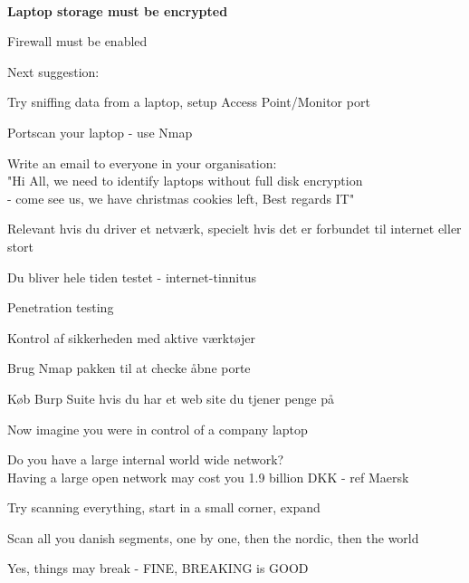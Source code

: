 \documentclass[Screen16to9,17pt]{foils}
\begin{document}
{~}
\begin{list1}
\item {\bf Laptop storage must be encrypted}
\item Firewall must be enabled
\item Next suggestion:
\begin{list2}
\item Try sniffing data from a laptop, setup Access Point/Monitor port
\item Portscan your laptop - use Nmap
\item Write an email to everyone in your organisation:\\
"Hi All, we need to identify laptops without full disk encryption \\
- come see us, we have christmas cookies left, Best regards IT"
\end{list2}
\end{list1}




\begin{list2}
\item Relevant hvis du driver et netværk, specielt hvis det er forbundet til internet eller stort
\item Du bliver hele tiden testet - internet-tinnitus
\item Penetration testing
\item Kontrol af sikkerheden med aktive værktøjer
\item Brug Nmap pakken til at checke åbne porte
\item Køb Burp Suite hvis du har et web site du tjener penge på
\end{list2}




\begin{list2}
\item Now imagine you were in control of a company laptop
\item Do you have a large internal world wide network?\\
Having a large open network may cost you 1.9 billion DKK - ref Maersk
\item Try scanning everything, start in a small corner, expand
\item Scan all you danish segments, one by one, then the nordic, then the world
\item Yes, things may break - FINE, BREAKING is GOOD
\end{list2}
\end{document}
